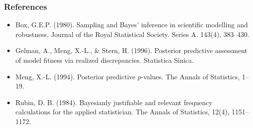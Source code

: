 \subsubsection{References}\label{references}

\begin{itemize}
\item
  Box, G.E.P. (1980). Sampling and Bayes' inference in scientific modelling and
  robustness. Journal of the Royal Statistical Society. Series A. 143(4), 383–430.
\item
  Gelman, A., Meng, X.-L., \& Stern, H. (1996). Posterior predictive assessment
  of model fitness via realized discrepancies. Statistica Sinica.
\item
  Meng, X.-L. (1994). Posterior predictive $p$-values. The Annals of
  Statistics, 1–19.
\item
  Rubin, D. B. (1984). Bayesianly justifiable and relevant frequency
  calculations for the applied statistician. The Annals of Statistics,
  12(4), 1151–1172.
\end{itemize}
